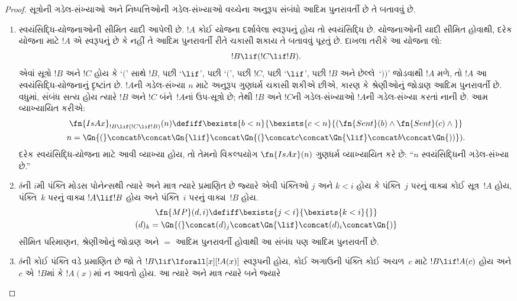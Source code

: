 \begin{proof}
સૂત્રોની ગડેલ-સંખ્યાઓ અને
નિષ્પત્તિઓની ગડેલ-સંખ્યાઓ વચ્ચેના
અનુરૂપ સંબંધો આદિમ પુનરાવર્તી છે
તે બતાવવું છે.
\begin{enumerate}
\item સ્વયંસિદ્ધિ-યોજનાઓની સીમિત યાદી
  આપેલી છે. $!A$ કોઈ યોજના દર્શાવેલા
  સ્વરૂપનું હોય તો સ્વયંસિદ્ધિ છે.
  યોજનાઓની યાદી સીમિત હોવાથી,
  દરેક યોજના માટે $!A$ એ સ્વરૂપનું
  છે કે નહીં તે આદિમ પુનરાવર્તી રીતે
  ચકાસી શકાય તે બતાવવું પૂરતું છે.
  દાખલા તરીકે આ યોજના લો:
  \[
  !B \lif (!C \lif !B).
  \]
  એવાં સૂત્રો $!B$ અને $!C$
  હોય કે `$($' સાથે $!B$, પછી
  `$\lif$', પછી `$($', પછી $!C$,
  પછી `$\lif$', પછી $!B$ અને
  છેલ્લે~`$))$' જોડવાથી $!A$ મળે,
  તો $!A$ આ સ્વયંસિદ્ધિ-યોજનાનું
  દૃષ્ટાંત છે. $!A$ની ગડેલ-સંખ્યા
  $n$ માટે અનુરૂપ ગુણધર્મ ચકાસી
  શકીએ છીએ, કારણ કે શ્રેણીઓનું
  જોડાણ આદિમ પુનરાવર્તી છે. વધુમાં,
  સંબંધ સત્ય હોય ત્યારે $!B$ અને
  $!C$ બંને~$!A$નાં ઉપ-સૂત્રો
  છે; તેથી $!B$ અને $!C$ની ગડેલ-સંખ્યાઓ
  $!A$ની ગડેલ-સંખ્યા કરતાં નાની
  છે. આમ વ્યાખ્યાયિત કરીએ:
  \begin{multline*}
  \fn{IsAx}_{!B \lif (!C \lif !B)}(n) \defiff \bexists{b< n}{
    \bexists{c < n}{(\fn{Sent}(b) \land \fn{Sent}(c) \land {}}}\\ n =
  \Gn{(} \concat b \concat \Gn{\lif} \concat \Gn{(} \concat c \concat
  \Gn{\lif} \concat b \concat \Gn{))}).
  \end{multline*}
  દરેક સ્વયંસિદ્ધિ-યોજના માટે આવી
  વ્યાખ્યા હોય, તો તેમનો વિકલ્પયોગ
  $\fn{IsAx}(n)$ ગુણધર્મ વ્યાખ્યાયિત
  કરે છે: ``$n$ સ્વયંસિદ્ધિની
  ગડેલ-સંખ્યા છે.''
\item $\delta$ની $i$મી પંક્તિ
  મોડસ પોનેન્સથી ત્યારે અને માત્ર
  ત્યારે પ્રમાણિત છે જ્યારે એવી
  પંક્તિઓ $j$ અને $k < i$ હોય કે
  પંક્તિ~$j$ પરનું વાક્ય
  કોઈ સૂત્ર~$!A$ હોય, પંક્તિ~$k$
  પરનું વાક્ય $!A \lif !B$ હોય
  અને પંક્તિ~$i$ પરનું વાક્ય~$!B$ હોય.
  \begin{multline*}
    \fn{MP}(d, i) \defiff \bexists{j < i}{\bexists{k < i}{}}\\
    (d)_k = \Gn{(} \concat (d)_j
      \concat \Gn{\lif} \concat (d)_i \concat \Gn{)}
  \end{multline*}
  સીમિત પરિમાણન, શ્રેણીઓનું જોડાણ
  અને $=$ આદિમ પુનરાવર્તી હોવાથી
  આ સંબંધ પણ આદિમ પુનરાવર્તી છે.
\item $\delta$ની કોઈ પંક્તિ
  \QR{} વડે પ્રમાણિત છે જો તે
  $!B \lif \lforall[x][!A(x)]$
  સ્વરૂપની હોય, કોઈ અગાઉની પંક્તિ
  કોઈ અચળ~$c$ માટે
  $!B \lif !A(c)$ હોય અને $c$
  એ~$!B$માં કે $!A(x)$માં ન આવતો હોય. આ ત્યારે
  અને માત્ર ત્યારે બને જ્યારે
  \begin{enumerate}

\end{enumerate}
\end{enumerate}
\end{proof}

